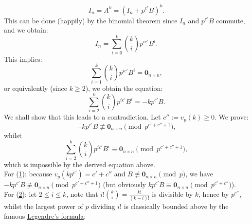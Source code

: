 \begin{solution}
    \[
        I_n = A^k = \left( I_n + p^{c'} B \right)^k.
    \]
    This can be done (happily) by the binomial theorem since \( I_n \) and \( p^{c'} B \) commute, and we obtain:
    \[
        I_n = \sum_{i=0}^{k} \binom{k}{i} p^{i c'} B^i.
    \]
    This implies:
    \[
        \sum_{i=1}^{k} \binom{k}{i} p^{i c'} B^i = \mathbf{0}_{n \times n},
    \]
    or equivalently (since \( k \geq 2 \)), we obtain the equation:
    \[
        \sum_{i=2}^{k} \binom{k}{i} p^{i c'} B^i = -k p^{c'} B.
    \]
    We shall show that this leads to a contradiction. Let \( c'' := v_p\left( k \right) \geq 0 \). We prove:
    \begin{equation}
        -k p^{c'} B \not\equiv \mathbf{0}_{n \times n} \pmod{p^{c' + c'' + 1}}, \label{1}
    \end{equation}
    whilst
    \begin{equation}
        \sum_{i=2}^{k} \binom{k}{i} p^{i c'} B^i \equiv \mathbf{0}_{n \times n} \pmod{p^{c' + c'' + 1}}, \label{2}
    \end{equation}
    which is impossible by the derived equation above. \\
    For (\hyperref[1]{1}): because \( v_p\left( k p^{c'} \right) = c' + c'' \) and \( B \not\equiv \mathbf{0}_{n \times n} \pmod{p} \), we have \( -k p^{c'} B \not\equiv \mathbf{0}_{n \times n} \pmod{p^{c' + c'' + 1}} \) (but obviously \( k p^{c'} B \equiv \mathbf{0}_{n \times n} \pmod{p^{c' + c''}} \)). \\
    For (\hyperref[2]{2}): let \( 2 \leq i \leq k \), note that \( i! \binom{k}{i} = \frac{k!}{\left( k-i \right)!} \) is divisible by \( k \), hence by \( p^{c''} \), whilst the largest power of \( p \) dividing \( i! \) is classically bounded above by the famous \href{https://en.wikipedia.org/wiki/Legendre%27s_formula}{Legendre's formula}:
    \[
\]
\end{solution}
